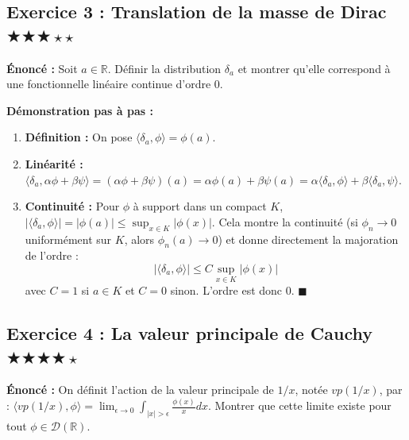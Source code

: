\documentclass[11pt,a4paper]{article}
\begin{document}
\subsection*{Exercice 3 : Translation de la masse de Dirac \quad $\bigstar\bigstar\bigstar\star\star$}

\textbf{Énoncé :}
Soit $a \in \mathbb{R}$. Définir la distribution $\delta_a$ et montrer qu'elle correspond à une fonctionnelle linéaire continue d'ordre 0.

\textbf{Démonstration pas à pas :}
\begin{enumerate}
\item \textbf{Définition :} On pose $\langle \delta_a, \phi \rangle = \phi(a)$.
\item \textbf{Linéarité :} $\langle \delta_a, \alpha \phi + \beta \psi \rangle = (\alpha \phi + \beta \psi)(a) = \alpha \phi(a) + \beta \psi(a) = \alpha \langle \delta_a, \phi \rangle + \beta \langle \delta_a, \psi \rangle$.
\item \textbf{Continuité :} Pour $\phi$ à support dans un compact $K$, $|\langle \delta_a, \phi \rangle| = |\phi(a)| \le \sup_{x \in K} |\phi(x)|$.
   Cela montre la continuité (si $\phi_n \to 0$ uniformément sur $K$, alors $\phi_n(a) \to 0$) et donne directement la majoration de l'ordre :
   $$ |\langle \delta_a, \phi \rangle| \le C \sup_{x \in K} |\phi(x)| $$ avec $C=1$ si $a \in K$ et $C=0$ sinon.
   L'ordre est donc $0$. $\blacksquare$
\end{enumerate}




\subsection*{Exercice 4 : La valeur principale de Cauchy \quad $\bigstar\bigstar\bigstar\bigstar\star$}

\textbf{Énoncé :}
On définit l'action de la valeur principale de $1/x$, notée $vp(1/x)$, par : $\langle vp(1/x), \phi \rangle = \lim_{\epsilon \to 0} \int_{|x| > \epsilon} \frac{\phi(x)}{x} dx$. Montrer que cette limite existe pour tout $\phi \in \mathcal{D}(\mathbb{R})$.
\end{document}
